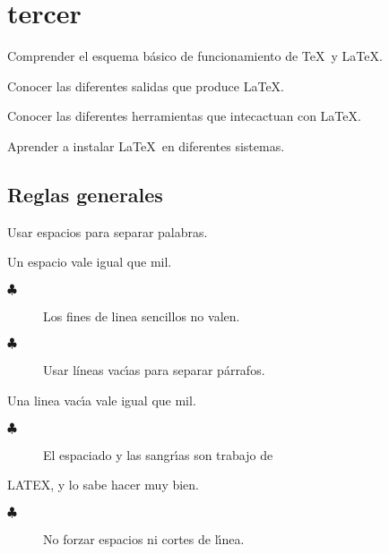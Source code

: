 \chapter{tercer}
\chaptertoc 
\begin{objetivos}
\begin{lista}
\item Comprender el esquema básico de funcionamiento de \TeX\, y \LaTeX .
\item Conocer las diferentes salidas que produce \LaTeX.
\item Conocer las diferentes herramientas que intecactuan con \LaTeX.
\item Aprender a instalar \LaTeX\, en diferentes sistemas.
\end{lista}
\end{objetivos}
\section{Reglas generales}

\begin{description}
\item[$\clubsuit$] Usar espacios para separar palabras.

\item Un espacio vale igual que mil.

\begin{description}
\item[$\clubsuit$] Los fines de linea sencillos no valen.

\item[$\clubsuit$] Usar líneas vac\'{\i}as para separar p\'{a}rrafos.
\end{description}
\end{description}

Una linea vac\'{\i}a vale igual que mil.

\begin{description}
\item
\begin{description}
\item[$\clubsuit$] El espaciado y las sangr\'{\i}as son trabajo de
\end{description}

\item LATEX, y lo sabe hacer muy bien.

\begin{description}
\item[$\clubsuit$] No forzar espacios ni cortes de l\'{\i}nea.
\end{description}
\end{description}

